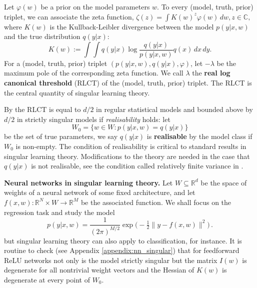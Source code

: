 \documentclass{article} %
\def\lto{\longrightarrow}
\begin{document}
Let  $\varphi(w)$ be a prior on the model parameters $w$.
To every (model, truth, prior) triplet, we can associate the zeta function,
$
\zeta(z) = \int K(w)^z \varphi(w) \,dw, z \in \mathbb C,
$
where $K(w)$ is the Kullback-Leibler divergence between the model $p(y|x,w)$ and the true distribution $q(y|x)$:
\begin{equation}
    K(w) := \int \!\int q(y|x) \log \frac{ q(y|x) }{ p(y|x,w) } q(x) \,dx \,dy.
\label{eq:KL}
\end{equation}
For a (model, truth, prior) triplet $(p(y|x,w),q(y|x),\varphi)$, let $-\lambda$ be the maximum pole of the corresponding zeta function. We call $\lambda$ the \textbf{real log canonical threshold} (RLCT) \citep{watanabe_algebraic_2009} of the (model, truth, prior) triplet. The RLCT is the central quantity of singular learning theory. 

By {\citet[Theorem 6.4]{watanabe_algebraic_2009}} the RLCT is equal to $d/2$ in regular statistical models and bounded above by $d/2$ in strictly singular models if \textit{realisability} holds: let 
$$
W_0 = \{w \in W: p(y|x,w)=q(y|x)\}
$$
be the set of true parameters,
we say $q(y|x)$ is \textbf{realisable} by the model class if $W_0$ is non-empty.
The condition of realisability is critical to standard results in singular learning theory. Modifications to the theory are needed in the case that $q(y|x)$ is not realisable, see the condition called relatively finite variance in \citet{watanabe_mathematical_2018}.

\textbf{Neural networks in singular learning theory.} Let $W \subseteq \mathbb{R}^d$ be the space of weights of a neural network of some fixed architecture, and let $f(x,w): \mathbb{R}^N \times W \lto \mathbb{R}^M$ be the associated function. We shall focus on the regression task and study the model
\begin{equation}
p(y|x,w) = \frac{1}{(2 \pi)^{M/2}} \exp\Big(-\tfrac{1}{2} \| y - f(x,w) \|^2 \Big)\,.
\label{eq:gaussian_model_in_w}
\end{equation}
but singular learning theory can also apply to classification, for instance. 
It is routine to check (see Appendix \ref{appendix:nn_singular}) that for feedforward ReLU networks not only is the model strictly singular but the matrix $I(w)$ is degenerate for all nontrivial weight vectors and the Hessian of $K(w)$ is degenerate at every point of $W_0$.
\end{document}
